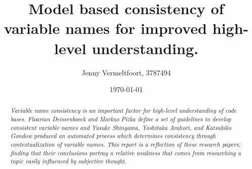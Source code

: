 \documentclass[a4paper,12pt]{article}
\begin{document}
\title{Model based consistency of variable names for improved high-level understanding.}
\author{Jenny Vermeltfoort, 3787494}
\date{\today}
\maketitle

\begin{abstract}
    \textit{Variable name consistency is an important factor for high-level understanding of code bases. Floarian
        Deissenboeck
        and Markus Pizka define a set of guidelines to develop consistent variable names and Yusuke Shinyama, Yoshitaka
        Arahori, and
        Katsuhiko Gondow produced an automated process which determines consistency through contextualization of
        variable
        names. This report is a reflection of these research papers; finding that their conclusions portray a relative
        weakness that comes from researching a topic easily influenced by subjective thought.}
\end{abstract}
\end{document}
